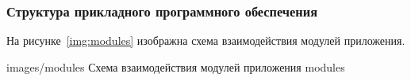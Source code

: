 \subsubsection{Структура прикладного программного обеспечения}

На рисунке~\ref{img:modules} изображна схема взаимодействия модулей приложения.

            {images/modules}
            {Схема взаимодействия модулей приложения}
            {modules}
